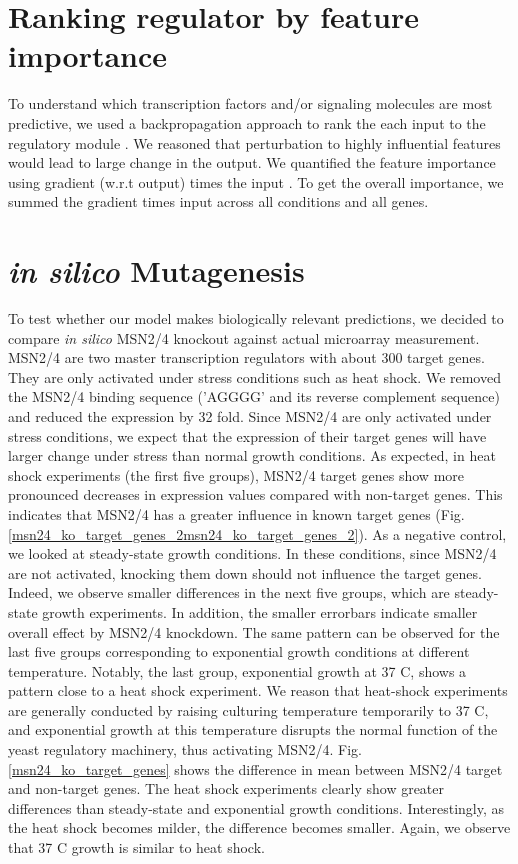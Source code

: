 \documentclass{article}
\begin{document}
\section{Ranking regulator by feature importance}
To understand which transcription factors and/or signaling molecules are most predictive, we used a backpropagation approach to rank the each input to the regulatory module \cite{Shrikumar:2016uy}. We reasoned that perturbation to highly influential features would lead to large change in the output. We quantified the feature importance using gradient (w.r.t output) times the input \cite{Samek:2016hk}. To get the overall importance, we summed the gradient times input across all conditions and all genes. 


\section{\textit{in silico} Mutagenesis}
To test whether our model makes biologically relevant predictions, we decided to compare \textit{in silico} MSN2/4 knockout against actual microarray measurement. MSN2/4 are two master transcription regulators with about 300 target genes. They are only activated under stress conditions such as heat shock. We removed the MSN2/4 binding sequence ('AGGGG' and its reverse complement sequence) and reduced the expression by 32 fold. Since MSN2/4 are only activated under stress conditions, we expect that the expression of their target genes will have larger change under stress than normal growth conditions. As expected, in heat shock experiments (the first five groups), MSN2/4 target genes show more pronounced decreases in expression values compared with non-target genes. This indicates that MSN2/4 has a greater influence in known target genes (Fig. \ref{msn24_ko_target_genes_2msn24_ko_target_genes_2}). As a negative control, we looked at steady-state growth conditions. In these conditions, since MSN2/4 are not activated, knocking them down should not influence the target genes. Indeed, we observe smaller differences in the next five groups, which are steady-state growth experiments. In addition, the smaller errorbars indicate smaller overall effect by MSN2/4 knockdown. The same pattern can be observed for the last five groups corresponding to exponential growth conditions at different temperature. Notably, the last group, exponential growth at 37 C, shows a pattern close to a heat shock experiment. We reason that heat-shock experiments are generally conducted by raising culturing temperature temporarily to 37 C, and exponential growth at this temperature disrupts the normal function of the yeast regulatory machinery, thus activating MSN2/4. Fig. \ref{msn24_ko_target_genes} shows the difference in mean between MSN2/4 target and non-target genes. The heat shock experiments clearly show greater differences than steady-state and exponential growth conditions. Interestingly, as the heat shock becomes milder, the difference becomes smaller. Again, we observe that 37 C growth is similar to heat shock. 
\end{document}
